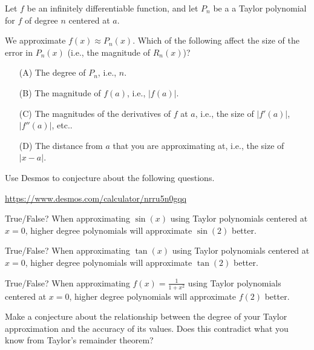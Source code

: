 \documentclass{workbook}
\begin{document}
\begin{slide}
	\question
	Let $f$ be an infinitely differentiable function, and let $P_n$ be a
	a Taylor polynomial for $f$ of degree $n$ centered at $a$.

	We approximate $f(x)\approx P_n(x)$. Which of the following affect the
	size of the error in $P_n(x)$ (i.e., the magnitude of $R_n(x)$)?

	\begin{enumerate}
		\item[(A)] The degree of $P_n$, i.e., $n$.
		\item[(B)] The magnitude of $f(a)$, i.e., $|f(a)|$.
		\item[(C)] The magnitudes of the derivatives of $f$ at $a$, i.e., the size of $|f'(a)|$, $|f''(a)|$, etc..
		\item[(D)] The distance from $a$ that you are approximating at, i.e.,
		      the size of $|x-a|$.

	\end{enumerate}
\end{slide}

\begin{slide}
	\question
	Use Desmos to conjecture about the following questions.

	\url{https://www.desmos.com/calculator/nrru5n0gqq}

	\begin{parts}
		\item True/False? When approximating $\sin(x)$ using Taylor polynomials centered at $x=0$, higher degree polynomials will approximate $\sin(2)$ better.
		\item True/False? When approximating $\tan(x)$ using Taylor polynomials centered at $x=0$, higher degree polynomials will approximate $\tan(2)$ better.

		\item True/False? When approximating $f(x)=\frac{1}{1+x^2}$ using Taylor polynomials centered at $x=0$, higher degree polynomials will approximate $f(2)$ better.

		\item Make a conjecture about the relationship between the degree of your Taylor approximation and the accuracy of its values. Does
		this contradict what you know from Taylor's remainder theorem?

	\end{parts}
\end{slide}
\end{document}
